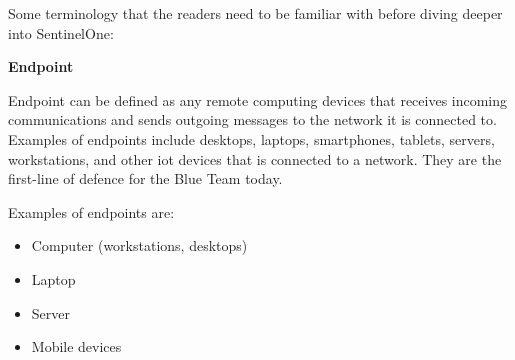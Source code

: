 Some terminology that the readers need to be familiar with before diving deeper into SentinelOne:

\textbf{Endpoint}

Endpoint can be defined as any remote computing devices that receives incoming communications and sends outgoing messages
to the network it is connected to. Examples of endpoints include desktops, laptops, smartphones, tablets, servers, workstations,
and other \acrshort{iot} devices that is connected to a network. They are the first-line of defence for the Blue Team today.

Examples of endpoints are:
\begin{itemize}
      \item Computer (workstations, desktops)
      \item Laptop
      \item Server
      \item Mobile devices
\end{itemize}






